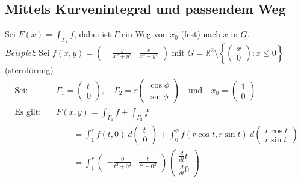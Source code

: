 \documentclass[11pt,a4paper]{book}
\newcommand {\Rzwei}	{\mathbb{R}^2}
\newcommand{\1}    	{\mathbbm{1}}
\begin{document}
\subsection{Mittels Kurvenintegral und passendem Weg}
Sei \(F(x)= \int_{\Gamma_x} f\), dabei ist \(\Gamma\) ein Weg von \(x_0\) (fest) nach \(x\) in \(G\).\\

\noindent
\textit{Beispiel}: Sei \(f(x,y) = \left( \begin{array}{cc}
	- \frac{y}{x^2 + y^2} &
	\frac{x}{x^2 + y^2}
\end{array} \right)\) mit \(G = \Rzwei \setminus \left\{ \left( \begin{array}{c} x \\ 0 \end{array}\right) : x \leqslant 0 \right\}\) (sternförmig)
\begin{align*}
	\textrm{Sei}: \quad & 
	\Gamma_1 = \left( \begin{array}{c} 
		t \\
		0
	\end{array} \right), \quad
	\Gamma_2 = r \left( \begin{array}{c} 
		\cos \phi \\
		\sin \phi
	\end{array} \right)
	\quad\textrm{und}\quad x_0 = \left( \begin{array}{c}
		1 \\ 0	
	\end{array} \right) \\
	\textrm{Es gilt}: \quad & 
	F(x,y) = \int_{\Gamma_1} f + \int_{\Gamma_2} f \\
	&\qquad = 
	\int_1^r f(t,0) ~d\left( \begin{array}{c}
		t \\ 0	
	\end{array} \right) +
	\int_0^\phi f(r \cos t, r \sin t	) ~d
	\left( \begin{array}{c}
		r \cos t \\
		r \sin t
	\end{array} \right) \\
	&\qquad = 
	\int_1^r \left( \begin{array}{cc}
		-\frac{0}{t^2 + 0^2} & 
		\frac{t}{t^2 + 0^2}	
	\end{array} \right) 
	\left( \begin{array}{c}
		\frac{d}{dt} t \\
		\frac{d}{dt} 0
	\end{array} \right)\\

\end{align*}
\end{document}
